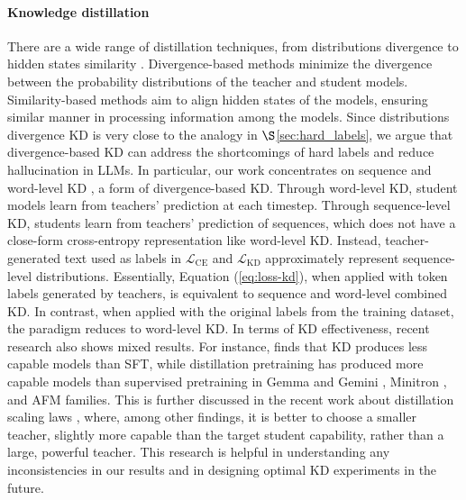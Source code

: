 \paragraph{Knowledge distillation}
There are a wide range of distillation techniques, from distributions divergence to hidden states similarity \cite{xu2024survey}. Divergence-based methods minimize the divergence between the probability distributions of the teacher and student models. Similarity-based methods aim to align hidden states of the models, ensuring similar manner in processing information among the models. Since distributions divergence KD is very close to the analogy in $\S$\ref{sec:hard_labels}, we argue that divergence-based KD can address the shortcomings of hard labels and reduce hallucination in LLMs. 
In particular, our work concentrates on sequence and word-level KD \cite{kim2016sequence}, a form of divergence-based KD. Through word-level KD, student models learn from teachers' prediction at each timestep. Through sequence-level KD, students learn from teachers' prediction of sequences, which does not have a close-form cross-entropy representation like word-level KD. Instead, teacher-generated text used as labels in $\mathcal{L}_{\text{CE}}$ and $\mathcal{L}_{\text{KD}}$ approximately represent sequence-level distributions. Essentially, Equation (\ref{eq:loss-kd}), when applied with token labels generated by teachers, is equivalent to sequence and word-level combined KD. In contrast, when applied with the original labels from the training dataset, the paradigm reduces to word-level KD.
In terms of KD effectiveness, recent research also shows mixed results. For instance, \citet{wang2024experimental} finds that KD produces less capable models than SFT, while distillation pretraining has produced more capable models than supervised pretraining in Gemma and Gemini \cite{team2024gemma}, Minitron \cite{sreenivas2024llm}, and AFM \cite{gunter2024apple} families. This is further discussed in the recent work about distillation scaling laws \cite{wang2024experimental}, where, among other findings, it is better to choose a smaller teacher, slightly more capable than the target student capability, rather than a large, powerful teacher. This research is helpful in understanding any inconsistencies in our results and in designing optimal KD experiments in the future.
